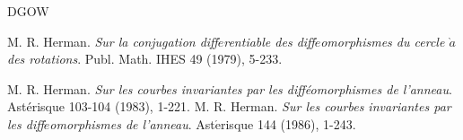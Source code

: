 \documentclass{amsart}
\newcounter{item}[section]
\theoremstyle{definition}
\begin{document}
\begin{thebibliography}{DGOW}
			
			
			
			
			
			
			 M. R. Herman. {\it Sur la conjugation diff$\acute{e}$rentiable des diff$\acute{e}$omorphismes du cercle $\grave{a}$ des
				rotations}. Publ. Math. IHES {49} (1979), 5-233.
			
			 M. R. Herman.  {\it Sur les courbes invariantes par les diff\'{e}omorphismes de
				l'anneau}. Ast\'{e}risque {103-104} (1983), 1-221.
			 M. R. Herman.  {\it Sur les courbes invariantes par les
				diff$\acute{e}$omorphismes de
				l'anneau}. Ast$\acute{\text{e}}$risque {144} (1986), 1-243.
			
			
			
			
			
			

\end{thebibliography}
\end{document}
